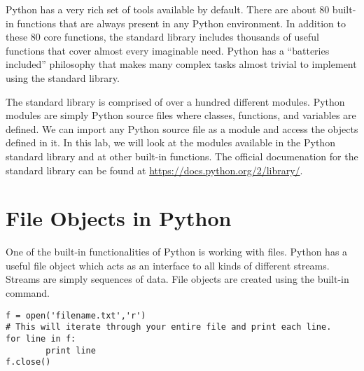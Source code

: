 \label{lab:Standard Library}

Python has a very rich set of tools available by default.
There are about 80 built-in functions that are always present in any Python environment.
In addition to these 80 core functions, the standard library includes thousands of useful functions that cover almost every imaginable need.
Python has a ``batteries included'' philosophy that makes many complex tasks almost trivial to implement using the standard library.


The standard library is comprised of over a hundred different modules.
Python modules are simply Python source files where classes, functions, and variables are defined.
We can import any Python source file as a module and access the objects defined in it.
In this lab, we will look at the modules available in the Python standard library and at other built-in functions. The official documenation for the standard library can be found at \url{https://docs.python.org/2/library/}.


\section*{File Objects in Python}
One of the built-in functionalities of Python is working with files.
Python has a useful file object which acts as an interface to all kinds of different streams. Streams are simply sequences of data.
File objects are created using the built-in  command.

\begin{lstlisting}
f = open('filename.txt','r')
# This will iterate through your entire file and print each line.
for line in f:
        print line
f.close()
\end{lstlisting}

